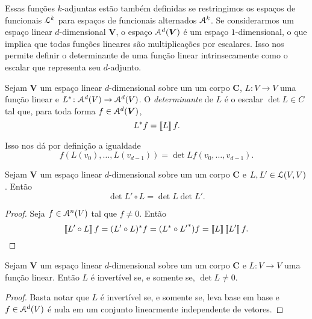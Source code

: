 Essas funções $k$-adjuntas estão também definidas se restringimos os espaços de funcionais $\mathcal{L}^k$ para espaços de funcionais alternados $\mathcal{A}^k$. Se considerarmos um espaço linear $d$-dimensional $\bm V$, o espaço $\mathcal{A}^d(\bm V)$ é um espaço $1$-dimensional, o que implica que todas funções lineares são multiplicações por escalares. Isso nos permite definir o determinante de uma função linear intrinsecamente como o escalar que representa seu $d$-adjunto.

\begin{definition}
Sejam $\bm V$ um espaço linear $d$-dimensional sobre um um corpo $\bm C$, $L\colon V \to V$ uma função linear e $L^*\colon \mathcal{A}^d(V) \to \mathcal{A}^d(V)$. O \emph{determinante} de $L$ é o escalar $\det{L} \in C$ tal que, para toda forma $f \in \mathcal{A}^d(\bm V)$,
	\begin{equation*}
	L^* f = \left\llbracket{L}\right\rrbracket f.
	\end{equation*}
\end{definition}

Isso nos dá por definição a igualdade
	\begin{equation*}
	f(L(v_0),\ldots,L(v_{d-1})) = \det{L}f(v_0,\ldots,v_{d-1}).
	\end{equation*}

\begin{proposition}
Sejam $\bm V$ um espaço linear $d$-dimensional sobre um um corpo $\bm C$ e $L,L' \in \mathcal{L}(V,V)$. Então
	\begin{equation*}
	\det{L' \circ L} = \det{L}\det{L'}.
	\end{equation*}
\end{proposition}
\begin{proof}
Seja $f \in \mathcal{A}^n(V)$ tal que $f \neq 0$. Então
	\begin{equation*}
	\left\llbracket{L' \circ L}\right\rrbracket f = (L' \circ L)^* f = ({L}^* \circ {L'}^*) f = \left\llbracket{L}\right\rrbracket\left\llbracket{L'}\right\rrbracket f.
	\end{equation*}
\end{proof}

\begin{proposition}
Sejam $\bm V$ um espaço linear $d$-dimensional sobre um um corpo $\bm C$ e $L\colon V \to V$ uma função linear. Então $L$ é invertível se, e somente se, $\det{L} \neq 0$.
\end{proposition}
\begin{proof}
Basta notar que $L$ é invertível se, e somente se, leva base em base e $f \in \mathcal{A}^d(V)$ é nula em um conjunto linearmente independente de vetores.
\end{proof}




